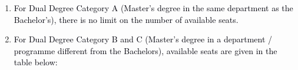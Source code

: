 \documentclass[12pt]{article}
\begin{document}
\vspace{\baselineskip}
\begin{enumerate}
	\item {\fontsize{10pt}{12.0pt}\selectfont \textcolor[HTML]{00000A}{For Dual Degree Category A (Master's degree in the same department as the Bachelor's), there is no limit on the number of available seats.}\par}\par


\vspace{\baselineskip}
	\item {\fontsize{10pt}{12.0pt}\selectfont \textcolor[HTML]{00000A}{For Dual Degree Category B and C (Master's degree in a department / programme different from the Bachelors), available seats are given in the table below:}\par}
\end{enumerate}\par


\vspace{\baselineskip}


\end{document}
